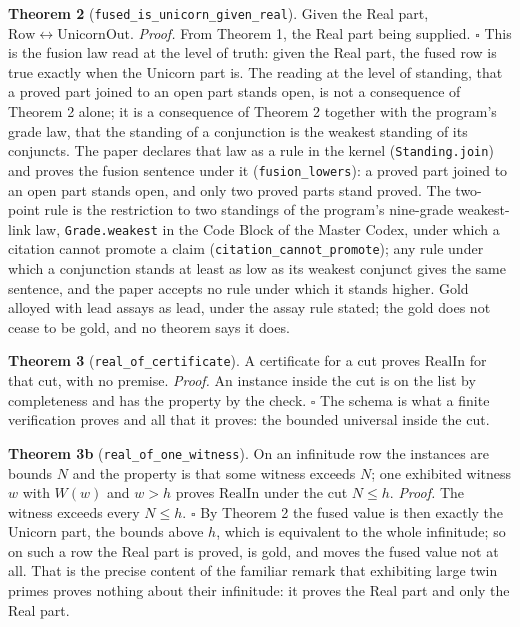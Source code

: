 \documentclass[10pt,twocolumn]{article}
\begin{document}
\textbf{Theorem 2} (\texttt{fused\_is\_unicorn\_given\_real}). Given the
Real part, \(\mathrm{Row} \leftrightarrow \mathrm{UnicornOut}\).
\emph{Proof.} From Theorem 1, the Real part being supplied. \(\square\)
This is the fusion law read at the level of truth: given the Real part,
the fused row is true exactly when the Unicorn part is. The reading at
the level of standing, that a proved part joined to an open part stands
open, is not a consequence of Theorem 2 alone; it is a consequence of
Theorem 2 together with the program's grade law, that the standing of a
conjunction is the weakest standing of its conjuncts. The paper declares
that law as a rule in the kernel (\texttt{Standing.join}) and proves the
fusion sentence under it (\texttt{fusion\_lowers}): a proved part joined
to an open part stands open, and only two proved parts stand proved. The
two-point rule is the restriction to two standings of the program's
nine-grade weakest-link law, \texttt{Grade.weakest} in the Code Block of
the Master Codex, under which a citation cannot promote a claim
(\texttt{citation\_cannot\_promote}); any rule under which a conjunction
stands at least as low as its weakest conjunct gives the same sentence,
and the paper accepts no rule under which it stands higher. Gold alloyed
with lead assays as lead, under the assay rule stated; the gold does not
cease to be gold, and no theorem says it does.

\textbf{Theorem 3} (\texttt{real\_of\_certificate}). A certificate for a
cut proves \(\mathrm{RealIn}\) for that cut, with no premise.
\emph{Proof.} An instance inside the cut is on the list by completeness
and has the property by the check. \(\square\) The schema is what a
finite verification proves and all that it proves: the bounded universal
inside the cut.

\textbf{Theorem 3b} (\texttt{real\_of\_one\_witness}). On an infinitude
row the instances are bounds \(N\) and the property is that some witness
exceeds \(N\); one exhibited witness \(w\) with \(W(w)\) and \(w > h\)
proves \(\mathrm{RealIn}\) under the cut \(N \le h\). \emph{Proof.} The
witness exceeds every \(N \le h\). \(\square\) By Theorem 2 the fused
value is then exactly the Unicorn part, the bounds above \(h\), which is
equivalent to the whole infinitude; so on such a row the Real part is
proved, is gold, and moves the fused value not at all. That is the
precise content of the familiar remark that exhibiting large twin primes
proves nothing about their infinitude: it proves the Real part and only
the Real part.
\end{document}
